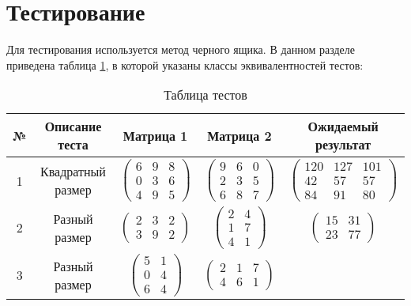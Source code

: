 \section{Тестирование}
Для тестирования используется метод черного ящика. В данном разделе приведена таблица \ref{table:ref1}, в которой указаны классы эквивалентностей тестов: \\

\begin{table}[ht!]
	\centering
	\captionsetup{singlelinecheck = false, justification=raggedleft}
	\caption{Таблица тестов}
	\label{table:ref1}
	\begin{tabular}{|c|c|c|c|c|}
		\hline
		№ &Описание теста & Матрица 1  &  Матрица 2   &  Ожидаемый результат\\\hline
		1& Квадратный размер  & $\begin{pmatrix}6 & 9 & 8\\0 & 3 & 6\\4 & 9 & 5\end{pmatrix}$
							  & $\begin{pmatrix}9 & 6 & 0\\2 & 3 & 5\\6 & 8 & 7\end{pmatrix}$
							  & $\begin{pmatrix}120 & 127 & 101\\42 & 57 & 57\\84 & 91 & 80\end{pmatrix}$
		\\ \hline
		2& Разный размер	  & $\begin{pmatrix}2 & 3 & 2\\3 & 9 & 2\end{pmatrix}$
							  & $\begin{pmatrix}2 & 4\\1 & 7\\4 & 1\end{pmatrix}$
							  & $\begin{pmatrix}15 & 31\\23 & 77\end{pmatrix}$
		\\ \hline
		3&Разный размер		& $\begin{pmatrix}5 & 1\\0 & 4\\6 & 4\end{pmatrix}$
							& $\begin{pmatrix}2 & 1 & 7\\4 & 6 & 1\end{pmatrix}$

\end{tabular}
\end{table}
